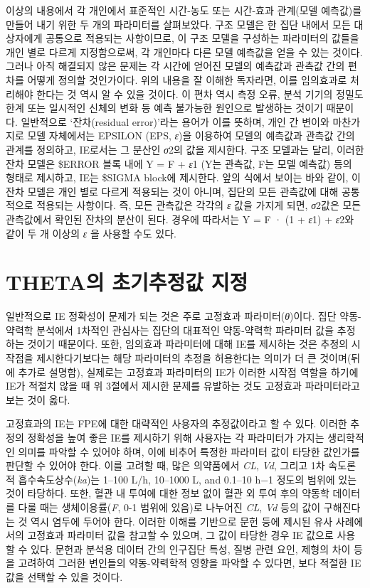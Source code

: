 \documentclass[
  10pt,
]{krantz}
\begin{document}
이상의 내용에서 각 개인에서 표준적인 시간-농도 또는 시간-효과 관계(모델 예측값)를 만들어 내기 위한 두 개의 파라미터를 살펴보았다. 구조 모델은 한 집단 내에서 모든 대상자에게 공통으로 적용되는 사항이므로, 이 구조 모델을 구성하는 파라미터의 값들을 개인 별로 다르게 지정함으로써, 각 개인마다 다른 모델 예측값을 얻을 수 있는 것이다. 그러나 아직 해결되지 않은 문제는 각 시간에 얻어진 모델의 예측값과 관측값 간의 편차를 어떻게 정의할 것인가이다. 위의 내용을 잘 이해한 독자라면, 이를 임의효과로 처리해야 한다는 것 역시 알 수 있을 것이다. 이 편차 역시 측정 오류, 분석 기기의 정밀도 한계 또는 일시적인 신체의 변화 등 예측 불가능한 원인으로 발생하는 것이기 때문이다. 일반적으로 `잔차(residual error)'라는 용어가 이를 뜻하며, 개인 간 변이와 마찬가지로 모델 자체에서는 EPSILON (EPS, \emph{ε})을 이용하여 모델의 예측값과 관측값 간의 관계를 정의하고, IE로서는 그 분산인 \emph{σ}2의 값을 제시한다. 구조 모델과는 달리, 이러한 잔차 모델은 \$ERROR 블록 내에 Y = F + \emph{ε}1 (Y는 관측값, F는 모델 예측값) 등의 형태로 제시하고, IE는 \$SIGMA block에 제시한다. 앞의 식에서 보이는 바와 같이, 이 잔차 모델은 개인 별로 다르게 적용되는 것이 아니며, 집단의 모든 관측값에 대해 공통적으로 적용되는 사항이다. 즉, 모든 관측값은 각각의 \emph{ε} 값을 가지게 되면, \emph{σ}2값은 모든 관측값에서 확인된 잔차의 분산이 된다. 경우에 따라서는 Y = F · (1 + \emph{ε}1) + \emph{ε}2와 같이 두 개 이상의 \emph{ε} 을 사용할 수도 있다.

\hypertarget{thetauxc758-uxcd08uxae30uxcd94uxc815uxac12-uxc9c0uxc815}{%
\section{THETA의 초기추정값 지정}\label{thetauxc758-uxcd08uxae30uxcd94uxc815uxac12-uxc9c0uxc815}}

일반적으로 IE 정확성이 문제가 되는 것은 주로 고정효과 파라미터(\emph{θ})이다. 집단 약동-약력학 분석에서 1차적인 관심사는 집단의 대표적인 약동-약력학 파라미터 값을 추정하는 것이기 때문이다. 또한, 임의효과 파라미터에 대해 IE를 제시하는 것은 추정의 시작점을 제시한다기보다는 해당 파라미터의 추정을 허용한다는 의미가 더 큰 것이며(뒤에 추가로 설명함), 실제로는 고정효과 파라미터의 IE가 이러한 시작점 역할을 하기에 IE가 적절치 않을 때 위 3절에서 제시한 문제를 유발하는 것도 고정효과 파라미터라고 보는 것이 옳다.

고정효과의 IE는 FPE에 대한 대략적인 사용자의 추정값이라고 할 수 있다. 이러한 추정의 정확성을 높여 좋은 IE를 제시하기 위해 사용자는 각 파라미터가 가지는 생리학적인 의미를 파악할 수 있어야 하며, 이에 비추어 특정한 파라미터 값이 타당한 값인가를 판단할 수 있어야 한다. 이를 고려할 때, 많은 의약품에서 \emph{CL}, \emph{Vd}, 그리고 1차 속도론적 흡수속도상수(\emph{ka})는 1--100 L/h, 10--1000 L, and 0.1--10 h−1 정도의 범위에 있는 것이 타당하다. 또한, 혈관 내 투여에 대한 정보 없이 혈관 외 투여 후의 약동학 데이터를 다룰 때는 생체이용률(\emph{F}, 0-1 범위에 있음)로 나누어진 \emph{CL}, \emph{Vd} 등의 값이 구해진다는 것 역시 염두에 두어야 한다. 이러한 이해를 기반으로 문헌 등에 제시된 유사 사례에서의 고정효과 파라미터 값을 참고할 수 있으며, 그 값이 타당한 경우 IE 값으로 사용할 수 있다. 문헌과 분석용 데이터 간의 인구집단 특성, 질병 관련 요인, 제형의 차이 등을 고려하여 그러한 변인들의 약동-약력학적 영향을 파악할 수 있다면, 보다 적절한 IE 값을 선택할 수 있을 것이다.
\end{document}
